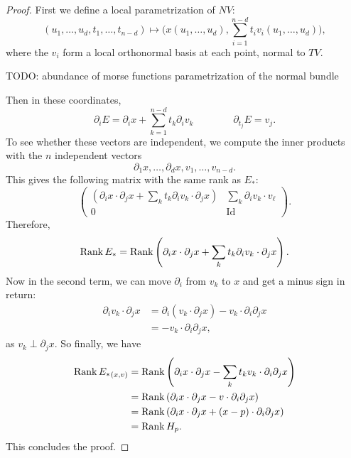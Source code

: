 \begin{proof}
    First we define a local parametrization of $NV$:
    \[
        (u_1, \ldots, u_d, t_1, \ldots, t_{n-d}) \mapsto \Big(x(u_1, \ldots, u_d), \sum_{i=1}^{n-d} t_i v_i(u_1, \ldots, u_{d})\Big)
    ,\] 
    where the $v_i$ form a local orthonormal basis at each point, normal to $TV$.
\begin{marginfigure}
    \centering
    \caption{TODO: abundance of morse functions parametrization of the normal bundle}
    \label{fig:abundance-of-morse-functions-parametrization-of-the-normal-bundle}
\end{marginfigure}
    Then in these coordinates,
    \[
        \partial_i E = \partial_i x  + \sum_{k=1}^{n-d} t_k \partial_i v_k 
        \qquad
        \qquad
        \partial_{t_j} E  = v_j
    .\]
    To see whether these vectors are independent, we compute the inner products with the $n$ independent vectors
    \[
    \partial_1 x , \ldots, \partial_d x , v_1, \ldots, v_{n-d}
    .\] 
    This gives the following matrix with the same rank as $E_*$:
     \[
    \begin{pmatrix}
        (\partial_i x\cdot \partial_j x + \sum_k t_k \partial_iv_{k} \cdot \partial_j x) &  \sum_k \partial_i v_{k} \cdot  v_\ell\\
        0 & \operatorname{Id}
    \end{pmatrix}
    .\] 
    Therefore,
    \[
    \operatorname{Rank} E_* = \operatorname{Rank} \left(\partial_i x\cdot \partial_j x + \sum_k t_k \partial_iv_{k} \cdot \partial_j x\right)  
    .\] 
    Now in the second term, we can move $\partial_i$ from $v_k$ to $x$ and get a minus sign in return:
    \begin{align*}
        \partial_iv_{k} \cdot \partial_j x &= \partial_i (v_k \cdot \partial_j x)  - v_k \cdot  \partial_i \partial_j x\\
                               &= - v_k \cdot  \partial_i \partial_j x
    ,\end{align*} 
    as $v_k \perp \partial_j x$.
    So finally, we have
    \begin{align*}
    \operatorname{Rank} {E_*}_{(x, v)}
        &= \operatorname{Rank} \left(\partial_i x\cdot \partial_j x - \sum_k t_k v_{k} \cdot \partial_i \partial_j x\right)  \\
        &= \operatorname{Rank} \left(\partial_i x\cdot \partial_j x - v \cdot \partial_i \partial_j x\right)  \\
        &= \operatorname{Rank} \left(\partial_i x\cdot \partial_j x + (x-p) \cdot \partial_i \partial_j x\right)  \\
        &= \operatorname{Rank} H_p
    .\end{align*} 
    This concludes the proof.
\end{proof}





